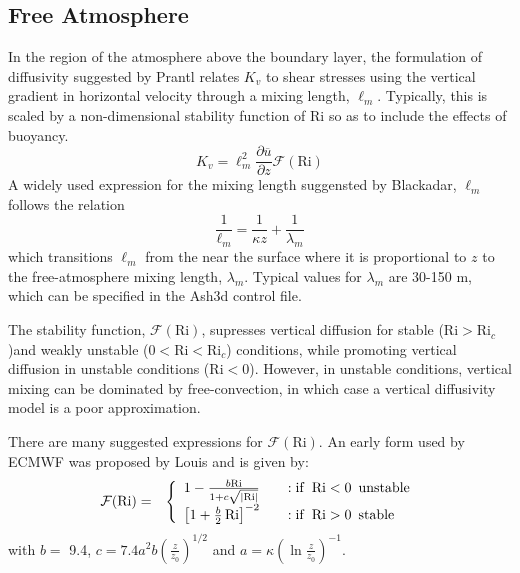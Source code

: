 \subsection{Free Atmosphere}
In the region of the atmosphere above the boundary layer, the formulation of diffusivity
suggested by Prantl relates $K_v$ to shear stresses using the vertical gradient in
horizontal velocity through a mixing length, $\ell_m$. %
Typically, this is scaled by a non-dimensional stability function of $\mathrm{Ri}$ so as to
include the effects of buoyancy.
\begin{equation}\label{VarDiff_Eq_Kz_FreAtmos}
K_v = \ell_m^2 \frac{\partial \overline{u}}{\partial z}  \mathcal{F}(\mathrm{Ri})
\end{equation}
A widely used expression for the mixing length suggensted by Blackadar, $\ell_m$ follows the relation
\begin{equation}\label{VarDiff_Eq_MixLen}
\frac{1}{\ell_m} = \frac{1}{\kappa z} + \frac{1}{\lambda_m}
\end{equation}
which transitions $\ell_m$ from the near the surface where it is proportional to $z$
to the free-atmosphere mixing length, $\lambda_m$. Typical
values for $\lambda_m$ are 30-150 $\mathrm{m}$, which can be specified in the Ash3d control file.

The stability function, $\mathcal{F}(\mathrm{Ri})$, supresses vertical diffusion for stable
($\mathrm{Ri}>\mathrm{Ri}_c$)and weakly unstable ($0<\mathrm{Ri} < \mathrm{Ri}_c$) conditions,
while promoting vertical diffusion in unstable conditions ($\mathrm{Ri}<0$).
However, in unstable conditions, vertical mixing
can be dominated by free-convection, in which case a vertical diffusivity model is a poor approximation.


There are many suggested expressions for $\mathcal{F}(\mathrm{Ri})$. An early form used by ECMWF was proposed
by Louis \cite{Louis1979} and is given by:
\begin{eqnarray}\label{VarDiff_Eq_F_Louis}
\mathcal{F}(\mathrm{Ri}) &=& \left\{ \begin{array} {l@{\quad \quad}l}
 1 - \frac{b \mathrm{Ri}}{1+c \sqrt{\left| \mathrm{Ri}\right|}}  &: \mathrm{if}\,\,\, \mathrm{Ri} < 0 \,\,\, \mathrm{unstable} \\
 \left[ 1+ \frac{b}{2} \, \mathrm{Ri} \right]^{-2}               &: \mathrm{if}\,\,\, \mathrm{Ri} > 0 \,\,\, \mathrm{stable}
\end{array}
\right.
\end{eqnarray}
with $b =$ 9.4, $c=7.4 a^2b \left( \frac{z}{z_0} \right)^{1/2}$ and $a=\kappa \left(\ln{\frac{z}{z_0}} \right)^{-1}$.

